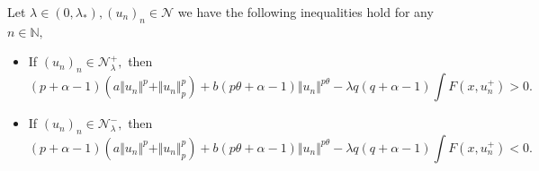 \documentclass[10pt,twoside,reqno,centertags,draft]{amsart}
\begin{document}
\begin{lemma}\label{l6}
Let $ \lambda \in (0, \lambda_*), (u_n)_n \in \mathcal{N}$ we have the following inequalities hold for any $ n \in \mathbb{N},$
\begin{itemize}
\item If $ (u_n)_n \in \mathcal{N}_{\lambda}^{+},$ then
\begin{equation*}
(p +\alpha -1) \left(a\Vert u_n \Vert^p + \Vert u_n \Vert_{p}^{p}\right) + b(p \theta +\alpha -1)\Vert u_n \Vert^{p \theta} - \lambda q (q +\alpha -1) \int F(x,u_n^+) >0.
\end{equation*}
\item If $ (u_n)_n \in \mathcal{N}_{\lambda}^{-},$ then
\begin{equation*}
(p +\alpha -1) \left(a\Vert u_n \Vert^p + \Vert u_n \Vert_{p}^{p}\right) + b(p \theta +\alpha -1)\Vert u_n \Vert^{p \theta} - \lambda q (q +\alpha -1) \int F(x,u_n^+) <0.
\end{equation*}
\end{itemize}
\end{lemma}
\end{document}
